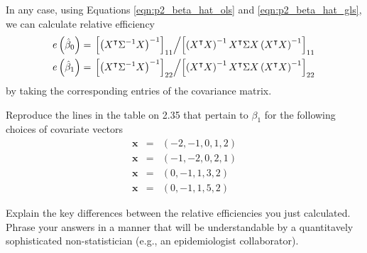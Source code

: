 \documentclass[11pt, letterpaper]{article}
\newcommand{\bx}{{\bm x}}
\newcommand{\beas}{\begin{eqnarray*}}
\newcommand{\eeas}{\end{eqnarray*}}
\begin{document}
\begin{enumerate}[(a)]
\begin{description}
  In any case, using Equations \ref{eqn:p2_beta_hat_ols} and
  \ref{eqn:p2_beta_hat_gls}, we can calculate relative efficiency
  \begin{align*}
    e\left(\hat{\beta}_0\right)
    &= \left.
      \left[\left(X^{\intercal}\Sigma^{-1}X\right)^{-1}\right]_{11}
      \middle/
      \left[\left(X^{\intercal}X\right)^{-1}X^\intercal
      \Sigma
      X\left(X^{\intercal}X\right)^{-1}\right]_{11}
      \right. \\
    e\left(\hat{\beta}_1\right)
    &= \left.
      \left[\left(X^{\intercal}\Sigma^{-1}X\right)^{-1}\right]_{22}
      \middle/
      \left[\left(X^{\intercal}X\right)^{-1}X^\intercal
      \Sigma
      X\left(X^{\intercal}X\right)^{-1}\right]_{22}
      \right.
  \end{align*}
  by taking the corresponding entries of the covariance matrix.
\end{description}
{\em \item Reproduce the lines in the table on 2.35 that pertain to $\beta_1$ for the following choices of covariate vectors
\beas
\bx&=&(-2,-1,0,1,2)\\
\bx&=&(-1,-2,0,2,1)\\
\bx&=&(0,-1,1,3,2)\\
\bx&=&(0,-1,1,5,2)
\eeas}
{\em \item Explain the key differences between the relative efficiencies you just calculated.  Phrase your answers in a manner that will be understandable by
a quantitavely sophisticated non-statistician (e.g., an epidemiologist collaborator).
}
\end{enumerate} 
\end{document}
